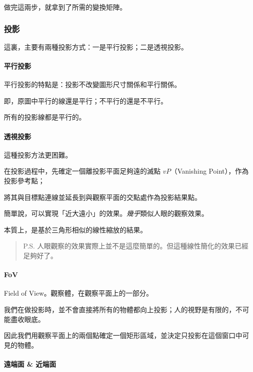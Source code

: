 \documentclass[
]{article}
\begin{document}
做完這兩步，就拿到了所需的變換矩陣。

\hypertarget{header-n58}{%
\subsubsection{投影}\label{header-n58}}

這裏，主要有兩種投影方式：一是平行投影；二是透視投影。

\hypertarget{header-n60}{%
\paragraph{平行投影}\label{header-n60}}

平行投影的特點是：投影不改變圖形尺寸關係和平行關係。

即，原圖中平行的線還是平行；不平行的還是不平行。

所有的投影線都是平行的。

\hypertarget{header-n64}{%
\paragraph{透視投影}\label{header-n64}}

這種投影方法更困難。

在投影過程中，先確定一個離投影平面足夠遠的滅點 \(vP\)（Vanishing
Point），作為投影參考點；

將其與目標點連線並延長到與觀察平面的交點處作為投影結果點。

簡單說，可以實現「近大遠小」的效果。\emph{幾乎}類似人眼的觀察效果。

本質上，是基於三角形相似的線性縮放的結果。

\begin{quote}
P.S.
人眼觀察的效果實際上並不是這麼簡單的。但這種線性簡化的效果已經足夠好了。
\end{quote}

\hypertarget{header-n72}{%
\paragraph{FoV}\label{header-n72}}

Field of View。觀察體，在觀察平面上的一部分。

我們在做投影時，並不會直接將所有的物體都向上投影；人的視野是有限的，不可能盡收眼底。

因此我們用觀察平面上的兩個點確定一個矩形區域，並決定只投影在這個窗口中可見的物體。

\hypertarget{header-n76}{%
\paragraph{遠端面 \& 近端面}\label{header-n76}}
\end{document}
